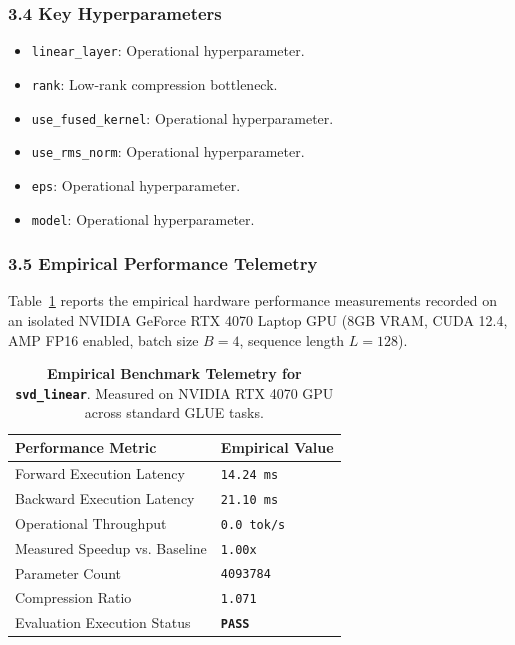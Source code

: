 \subsubsection*{3.4 Key Hyperparameters}
\begin{itemize}
    \item \texttt{linear\_layer}: Operational hyperparameter.
    \item \texttt{rank}: Low-rank compression bottleneck.
    \item \texttt{use\_fused\_kernel}: Operational hyperparameter.
    \item \texttt{use\_rms\_norm}: Operational hyperparameter.
    \item \texttt{eps}: Operational hyperparameter.
    \item \texttt{model}: Operational hyperparameter.
\end{itemize}

\subsubsection*{3.5 Empirical Performance Telemetry}
Table~\ref{tab:telemetry_svd\_linear} reports the empirical hardware performance measurements recorded on an isolated NVIDIA GeForce RTX 4070 Laptop GPU (8GB VRAM, CUDA 12.4, AMP FP16 enabled, batch size $B=4$, sequence length $L=128$).

\begin{table}[h]
\centering
\small
\caption{\textbf{Empirical Benchmark Telemetry for \texttt{svd\_linear}}. Measured on NVIDIA RTX 4070 GPU across standard GLUE tasks.}
\label{tab:telemetry_svd\_linear}
\begin{tabularx}{\columnwidth}{lX}
\toprule
\textbf{Performance Metric} & \textbf{Empirical Value} \\
\midrule
Forward Execution Latency & \texttt{14.24 ms} \\
Backward Execution Latency & \texttt{21.10 ms} \\
Operational Throughput & \texttt{0.0 tok/s} \\
Measured Speedup vs. Baseline & \texttt{1.00x} \\
Parameter Count & \texttt{4093784} \\
Compression Ratio & \texttt{1.071} \\
Evaluation Execution Status & \textbf{\texttt{PASS}} \\
\bottomrule
\end{tabularx}
\end{table}

